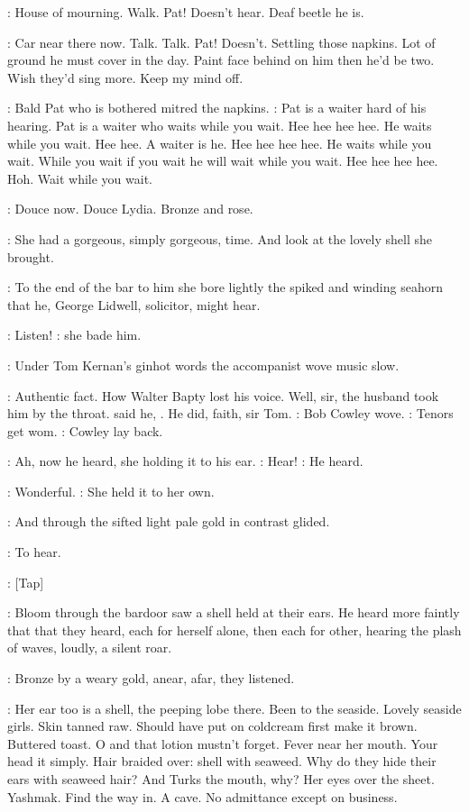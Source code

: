 \BloomInt:
House of mourning.
Walk.
Pat!
Doesn't hear.
Deaf beetle he is.

\BloomInt:
Car near there now.
Talk.
Talk.
Pat!
Doesn't.
Settling those napkins.
Lot of ground he must cover in the day.
Paint face behind on him then he'd
be two.
Wish they'd sing more.
Keep my mind off.

:
Bald Pat who is bothered mitred the napkins.
\BloomInt:
Pat is a waiter hard of
his hearing.
Pat is a waiter who waits while you wait.
Hee hee hee hee.
He
waits while you wait.
Hee hee.
A waiter is he.
Hee hee hee hee.
He waits
while you wait.
While you wait if you wait he will wait while you wait.
Hee hee hee hee.
Hoh.
Wait while you wait.

:
Douce now.
Douce Lydia.
Bronze and rose.

:
She had a gorgeous,
simply gorgeous,
time.
And look at the lovely
shell she brought.

:
To the end of the bar to him she bore lightly the spiked and winding
seahorn that he,
George Lidwell,
solicitor,
might hear.

\MissD:
Listen!
:
she bade him.

:
Under Tom Kernan's ginhot words the accompanist wove music slow.

\BloomInt:
Authentic fact.
How Walter Bapty lost his voice.
Well,
sir,
the husband took him by the throat.
said he,
.
He did,
faith,
sir Tom.
:
Bob Cowley wove.
\BloomInt:
Tenors get wom.
:
Cowley lay back.

:
Ah,
now he heard,
she holding it to his ear.
\MissD:
Hear!
:
He heard.

\lidwell:
Wonderful.
:
She held it to her own.

:
And through the sifted light pale gold
in contrast glided.

\BloomInt:
To hear.

\stripling:
[Tap]

:
Bloom through the bardoor saw a shell held at their ears.
He heard
more faintly that that they heard,
each for herself alone,
then each for
other,
hearing the plash of waves,
loudly,
a silent roar.

:
Bronze by a weary gold,
anear,
afar,
they listened.

\BloomInt:
Her ear too is a shell,
the peeping lobe there.
Been to the seaside.
Lovely seaside girls.
Skin tanned raw.
Should have put on coldcream first
make it brown.
Buttered toast.
O and that lotion mustn't forget.
Fever
near her mouth.
Your head it simply.
Hair braided over:
shell with
seaweed.
Why do they hide their ears with seaweed hair?
And Turks the
mouth,
why?
Her eyes over the sheet.
Yashmak.
Find the way in.
A cave.
No
admittance except on business.


